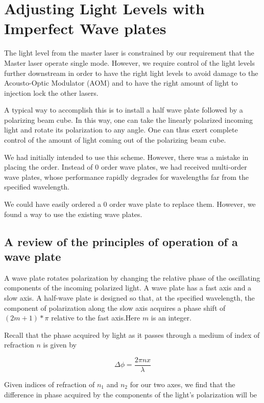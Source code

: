 \chapter{Adjusting Light Levels with Imperfect Wave plates}
\label{twoWaveplateTrick}

The light level from the master laser is constrained by our requirement that the Master laser operate single mode. However, we require control of the light levels further downstream in order to have the right light levels to avoid damage to the Acousto-Optic Modulator (AOM) and to have the right amount of light to injection lock the other lasers. 

A typical way to accomplish this is to install a half wave plate followed by a polarizing beam cube. In this way, one can take the linearly polarized incoming light and rotate its polarization to any angle. One can thus exert complete control of the amount of light coming out of the polarizing beam cube. 

We had initially intended to use this scheme. However, there was a mistake in placing the order. Instead of 0 order wave plates, we had received multi-order wave plates, whose performance rapidly degrades for wavelengths far from the specified wavelength. 

We could have easily ordered a 0 order wave plate to replace them. However, we found a way to use the existing wave plates.

\section{A review of the principles of operation of a wave plate}

A wave plate rotates polarization by changing the relative phase of the oscillating components of the incoming polarized light. A wave plate has a fast axis and a slow axis. A half-wave plate is designed so that, at the specified wavelength, the component of polarization along the slow axis acquires a phase shift of $(2m+1)*\pi$ relative to the fast axis.Here $m$ is an integer. 

Recall that the phase acquired by light as it passes through a medium of index of refraction $n$ is given by 

\begin{equation}
  \Delta \phi = \frac{2 \pi n x}{\lambda} \label{deltaPhi0}
\end{equation}

Given indices of refraction of $n_1$ and $n_2$ for our two axes, we find that the difference in phase acquired by the components of the light's polarization will be 

